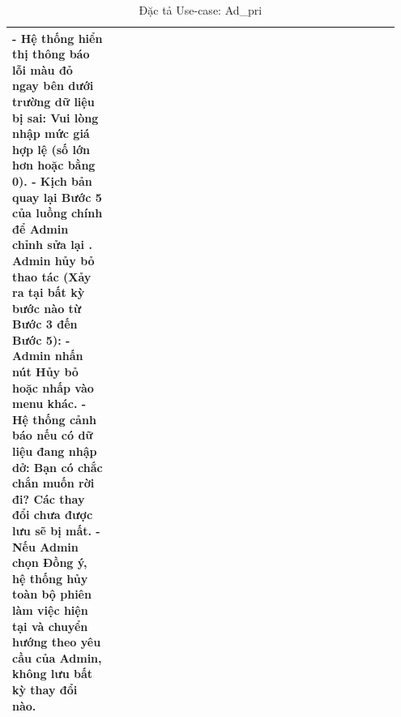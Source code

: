 \begin{table}[htpb]
\begin{tabular}{|p{0.25\linewidth}|p{0.7\linewidth}|}
- Hệ thống hiển thị thông báo lỗi màu đỏ ngay bên dưới trường dữ liệu bị sai: Vui lòng nhập mức giá hợp lệ (số lớn hơn hoặc bằng 0). \newline
- Kịch bản quay lại Bước 5 của luồng chính để Admin chỉnh sửa lại \newline
2. Admin hủy bỏ thao tác (Xảy ra tại bất kỳ bước nào từ Bước 3 đến Bước 5): \newline
- Admin nhấn nút Hủy bỏ hoặc nhấp vào menu khác. \newline
- Hệ thống cảnh báo nếu có dữ liệu đang nhập dở: Bạn có chắc chắn muốn rời đi? Các thay đổi chưa được lưu sẽ bị mất. \newline
- Nếu Admin chọn Đồng ý, hệ thống hủy toàn bộ phiên làm việc hiện tại và chuyển hướng theo yêu cầu của Admin, không lưu bất kỳ thay đổi nào.\\ \hline
\end{tabular}
\caption{Đặc tả Use-case: Ad\_pri}
\label{tab:uc_mem_pay}
\end{table}




